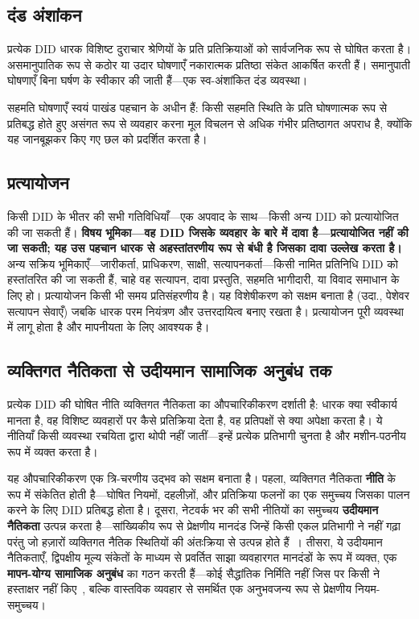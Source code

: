 \documentclass[11pt,a4paper,twocolumn]{article}
\begin{document}
\subsection{दंड अंशांकन}

प्रत्येक DID धारक विशिष्ट दुराचार श्रेणियों के प्रति प्रतिक्रियाओं को सार्वजनिक रूप से घोषित करता है। असमानुपातिक रूप से कठोर या उदार घोषणाएँ नकारात्मक प्रतिष्ठा संकेत आकर्षित करती हैं। समानुपाती घोषणाएँ बिना घर्षण के स्वीकार की जाती हैं---एक स्व-अंशांकित दंड व्यवस्था।

सहमति घोषणाएँ स्वयं पाखंड पहचान के अधीन हैं: किसी सहमति स्थिति के प्रति घोषणात्मक रूप से प्रतिबद्ध होते हुए असंगत रूप से व्यवहार करना मूल विचलन से अधिक गंभीर प्रतिष्ठागत अपराध है, क्योंकि यह जानबूझकर किए गए छल को प्रदर्शित करता है।

\subsection{प्रत्यायोजन}

किसी DID के भीतर की सभी गतिविधियाँ---एक अपवाद के साथ---किसी अन्य DID को प्रत्यायोजित की जा सकती हैं। \textbf{विषय भूमिका---वह DID जिसके व्यवहार के बारे में दावा है---प्रत्यायोजित नहीं की जा सकती; यह उस पहचान धारक से अहस्तांतरणीय रूप से बंधी है जिसका दावा उल्लेख करता है।} अन्य सक्रिय भूमिकाएँ---जारीकर्ता, प्राधिकरण, साक्षी, सत्यापनकर्ता---किसी नामित प्रतिनिधि DID को हस्तांतरित की जा सकती हैं, चाहे वह सत्यापन, दावा प्रस्तुति, सहमति भागीदारी, या विवाद समाधान के लिए हो। प्रत्यायोजन किसी भी समय प्रतिसंहरणीय है। यह विशेषीकरण को सक्षम बनाता है (उदा., पेशेवर सत्यापन सेवाएँ) जबकि धारक परम नियंत्रण और उत्तरदायित्व बनाए रखता है। प्रत्यायोजन पूरी व्यवस्था में लागू होता है और मापनीयता के लिए आवश्यक है।

\subsection{व्यक्तिगत नैतिकता से उदीयमान सामाजिक अनुबंध तक}

प्रत्येक DID की घोषित नीति व्यक्तिगत नैतिकता का औपचारिकीकरण दर्शाती है: धारक क्या स्वीकार्य मानता है, वह विशिष्ट व्यवहारों पर कैसे प्रतिक्रिया देता है, वह प्रतिपक्षों से क्या अपेक्षा करता है। ये नीतियाँ किसी व्यवस्था रचयिता द्वारा थोपी नहीं जातीं---इन्हें प्रत्येक प्रतिभागी चुनता है और मशीन-पठनीय रूप में व्यक्त करता है।

यह औपचारिकीकरण एक त्रि-चरणीय उद्भव को सक्षम बनाता है। पहला, व्यक्तिगत नैतिकता \textbf{नीति} के रूप में संकेतित होती है---घोषित नियमों, दहलीज़ों, और प्रतिक्रिया फलनों का एक समुच्चय जिसका पालन करने के लिए DID प्रतिबद्ध होता है। दूसरा, नेटवर्क भर की सभी नीतियों का समुच्चय \textbf{उदीयमान नैतिकता} उत्पन्न करता है---सांख्यिकीय रूप से प्रेक्षणीय मानदंड जिन्हें किसी एकल प्रतिभागी ने नहीं गढ़ा परंतु जो हज़ारों व्यक्तिगत नैतिक स्थितियों की अंतःक्रिया से उत्पन्न होते हैं~\cite{durkheim1893}। तीसरा, ये उदीयमान नैतिकताएँ, द्विपक्षीय मूल्य संकेतों के माध्यम से प्रवर्तित साझा व्यवहारगत मानदंडों के रूप में व्यक्त, एक \textbf{मापन-योग्य सामाजिक अनुबंध} का गठन करती हैं---कोई सैद्धांतिक निर्मिति नहीं जिस पर किसी ने हस्ताक्षर नहीं किए~\cite{rawls1971}, बल्कि वास्तविक व्यवहार से समर्थित एक अनुभवजन्य रूप से प्रेक्षणीय नियम-समुच्चय।
\end{document}
